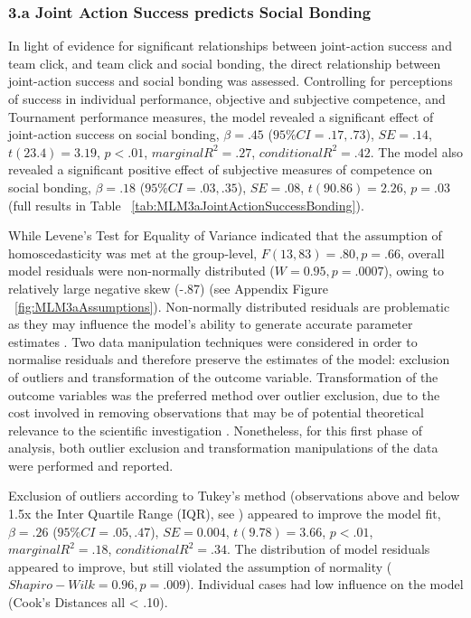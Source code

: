 




\subsubsection{3.a Joint Action Success predicts Social Bonding}

In light of evidence for significant relationships between joint-action success and team click, and team click and social bonding, the direct relationship between joint-action success and social bonding was assessed. Controlling for perceptions of success in individual performance, objective and subjective competence, and Tournament performance measures, the model revealed a significant effect of joint-action success on social bonding, $\beta = .45$ ($95\% CI =  .17, .73$), $SE = .14$, $t(23.4) = 3.19$, $p < .01$, $marginal R^2 = .27$, $conditional R^2 = .42$.  The model also revealed a significant positive effect of subjective measures of competence on social bonding, $\beta = .18$ ($95\% CI =  .03, .35$), $SE = .08$, $t(90.86) = 2.26$, $p = .03$ (full results in Table ~\ref{tab:MLM3aJointActionSuccessBonding}).

While Levene's Test for Equality of Variance indicated that the assumption of homoscedasticity was met at the group-level, $F(13,83) = .80, p = .66$, overall model residuals were non-normally distributed ($W = 0.95, p = .0007$), owing to relatively large negative skew (-.87) (see Appendix Figure ~\ref{fig:MLM3aAssumptions}). Non-normally distributed residuals are problematic as they may influence the model's ability to generate accurate parameter estimates . Two data manipulation techniques were considered in order to normalise residuals and therefore preserve the estimates of the model: exclusion of outliers and transformation of the outcome variable.  Transformation of the outcome variables was the preferred method over outlier exclusion, due to the cost involved in removing observations that may be of potential theoretical relevance to the scientific investigation \citep{Rousseeuw2011}. Nonetheless, for this first phase of analysis, both outlier exclusion and transformation manipulations of the data were performed and reported.

Exclusion of outliers according to Tukey's method (observations above and below 1.5x the Inter Quartile Range (IQR), see \citep{Tukey1977}) appeared to improve the model fit, $\beta = .26$ ($95\% CI =  .05, .47$), $SE = 0.004$, $t(9.78) = 3.66$, $p < .01$, $marginal R^2 = .18$, $conditional R^2 = .34$.
The distribution of model residuals appeared to improve, but still violated the assumption of normality ($Shapiro-Wilk = 0.96, p = .009$).  Individual cases had low influence on the model (Cook's Distances all < .10).

